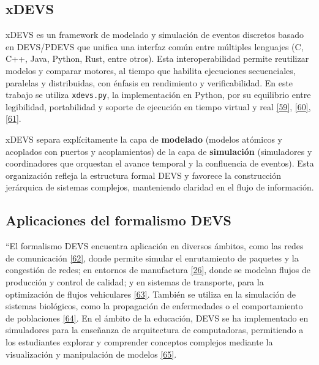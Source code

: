 \documentclass[12pt,oneside]{templates/unerthesis}
\begin{document}
\hypertarget{xdevs}{%
\subsection{xDEVS}\label{xdevs}}

xDEVS es un framework de modelado y simulación de eventos discretos basado en DEVS/PDEVS que unifica una interfaz común entre múltiples lenguajes (C, C++, Java, Python, Rust, entre otros). Esta interoperabilidad permite reutilizar modelos y comparar motores, al tiempo que habilita ejecuciones secuenciales, paralelas y distribuidas, con énfasis en rendimiento y verificabilidad. En este trabajo se utiliza \texttt{xdevs.py}, la implementación en Python, por su equilibrio entre legibilidad, portabilidad y soporte de ejecución en tiempo virtual y real \protect\hyperlink{ref-risco2023}{{[}59{]}}, \protect\hyperlink{ref-xdevs_github}{{[}60{]}}, \protect\hyperlink{ref-xdevs_py_github}{{[}61{]}}.

xDEVS separa explícitamente la capa de \textbf{modelado} (modelos atómicos y acoplados con puertos y acoplamientos) de la capa de \textbf{simulación} (simuladores y coordinadores que orquestan el avance temporal y la confluencia de eventos). Esta organización refleja la estructura formal DEVS y favorece la construcción jerárquica de sistemas complejos, manteniendo claridad en el flujo de información.

\hypertarget{aplicaciones-del-formalismo-devs}{%
\subsection{Aplicaciones del formalismo DEVS}\label{aplicaciones-del-formalismo-devs}}

``El formalismo DEVS encuentra aplicación en diversos ámbitos, como las redes de comunicación \protect\hyperlink{ref-fujimoto2001parallel}{{[}62{]}}, donde permite simular el enrutamiento de paquetes y la congestión de redes; en entornos de manufactura \protect\hyperlink{ref-zeigler_theory_2000}{{[}26{]}}, donde se modelan flujos de producción y control de calidad; y en sistemas de transporte, para la optimización de flujos vehiculares \protect\hyperlink{ref-barros1997modeling}{{[}63{]}}. También se utiliza en la simulación de sistemas biológicos, como la propagación de enfermedades o el comportamiento de poblaciones \protect\hyperlink{ref-zeigler2004continuity}{{[}64{]}}. En el ámbito de la educación, DEVS se ha implementado en simuladores para la enseñanza de arquitectura de computadoras, permitiendo a los estudiantes explorar y comprender conceptos complejos mediante la visualización y manipulación de modelos \protect\hyperlink{ref-calvo2010simulador}{{[}65{]}}.
\end{document}
